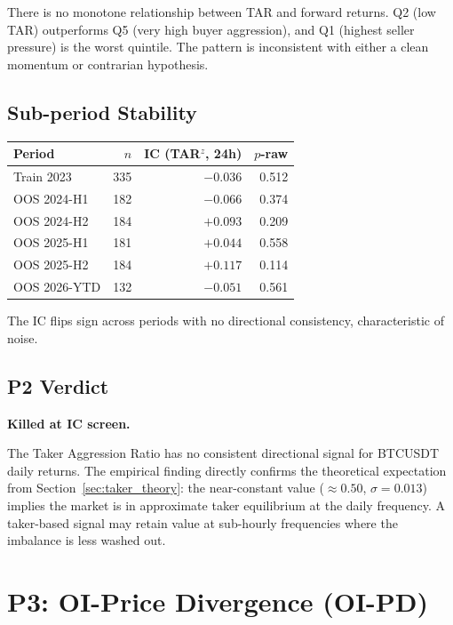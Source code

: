 \documentclass[12pt, a4paper]{article}
\theoremstyle{plain}
\theoremstyle{definition}
\begin{document}
There is no monotone relationship between TAR and forward returns.
Q2 (low TAR) outperforms Q5 (very high buyer aggression), and Q1
(highest seller pressure) is the worst quintile.  The pattern is
inconsistent with either a clean momentum or contrarian hypothesis.

\subsection{Sub-period Stability}

\begin{center}
\begin{tabular}{lrrr}
\toprule
Period & $n$ & IC (TAR$^z$, 24h) & $p$-raw \\
\midrule
Train 2023   & 335 & $-0.036$ & 0.512 \\
OOS 2024-H1  & 182 & $-0.066$ & 0.374 \\
OOS 2024-H2  & 184 & $+0.093$ & 0.209 \\
OOS 2025-H1  & 181 & $+0.044$ & 0.558 \\
OOS 2025-H2  & 184 & $+0.117$ & 0.114 \\
OOS 2026-YTD & 132 & $-0.051$ & 0.561 \\
\bottomrule
\end{tabular}
\end{center}

The IC flips sign across periods with no directional consistency,
characteristic of noise.

\subsection{P2 Verdict}

\textbf{Killed at IC screen.}

The Taker Aggression Ratio has no consistent directional signal for
BTCUSDT daily returns.  The empirical finding directly confirms the
theoretical expectation from Section~\ref{sec:taker_theory}: the
near-constant value ($\approx 0.50$, $\sigma = 0.013$) implies the market
is in approximate taker equilibrium at the daily frequency.  A taker-based
signal may retain value at sub-hourly frequencies where the imbalance is
less washed out.

\section{P3: OI-Price Divergence (OI-PD)}
\label{sec:p3}
\end{document}

